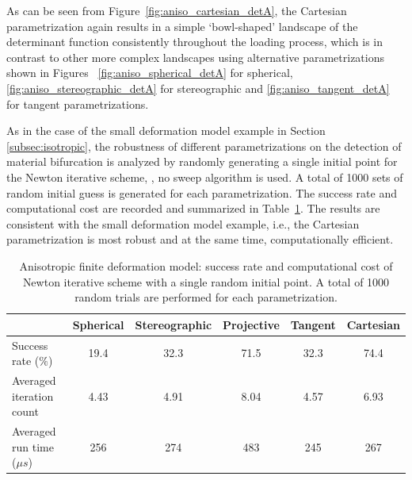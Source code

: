 \documentclass[12pt]{article}
\numberwithin{equation}{section}
\begin{document}
As can be seen from Figure~\ref{fig:aniso_cartesian_detA}, the
Cartesian parametrization again results in a simple `bowl-shaped'
landscape of the determinant function consistently throughout the
loading process, which is in contrast to other more complex landscapes
using alternative parametrizations shown in Figures~
\ref{fig:aniso_spherical_detA} for spherical,
\ref{fig:aniso_stereographic_detA} for stereographic and
\ref{fig:aniso_tangent_detA} for tangent parametrizations.

As in the case of the small deformation model example in
Section \ref{subsec:isotropic}, the robustness of different
parametrizations on the detection of material bifurcation is analyzed
by randomly generating a single initial point for the Newton iterative
scheme, \ie, no sweep algorithm is used. A total of 1000 sets of
random initial guess is generated for each parametrization. The
success rate and computational cost are recorded and summarized in
Table~\ref{tab:aniso_axial_random_para}. The results are consistent
with the small deformation model example, i.e., the Cartesian
parametrization is most robust and at the same time, computationally efficient.

\begin{table}[H]
  \begin{center}
    \begin{tabular}{l | c c c c c}
      \toprule
        &  Spherical    &   Stereographic   & Projective   &   Tangent   &   Cartesian                 \\
      \midrule
      Success rate ($\%$)                      &    19.4    &    32.3     &    71.5     &    32.3     &     74.4          \\
      Averaged iteration count               &    4.43    &    4.91    &    8.04     &    4.57    &    6.93         \\
      Averaged run time (${\mu}s$)     &    256     &    274     &    483      &    245      &    267         \\
      \bottomrule
    \end{tabular}
    \caption{Anisotropic finite deformation model: success rate and computational cost of Newton iterative scheme with a single random initial point. A total of 1000 random trials are performed for each parametrization.}
    \label{tab:aniso_axial_random_para}
  \end{center}
\end{table}
\end{document}
